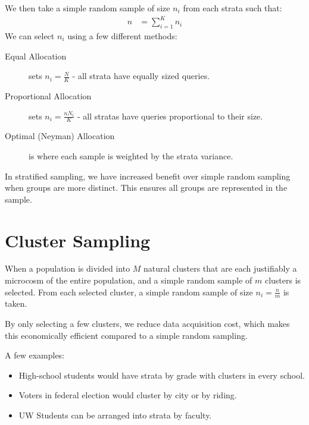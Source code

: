                 We then take a simple random sample of size $n_i$ from each strata such that:
                \begin{align*}
                    n &= \sum_{i=1}^K n_i
                \end{align*}
                We can select $n_i$ using a few different methods:
                \begin{description}
                    \item[Equal Allocation] sets $n_i = \frac{N}{K}$ - all strata have equally sized queries.
                    \item[Proportional Allocation] sets $n_i = \frac{n N_i}{K}$ - all stratas have queries proportional to their size.
                    \item[Optimal (Neyman) Allocation] is where each sample is weighted by the strata variance.
                \end{description}
                In stratified sampling, we have increased benefit over simple random sampling when groups are more distinct.
                This ensures all groups are represented in the sample.
            \section{Cluster Sampling} %
            \label{sec:cluster_sampling}
                When a population is divided into $M$ natural clusters that are each justifiably a microcosm of the entire population, and a simple random sample of $m$ clusters is selected.
                From each selected cluster, a simple random sample of size $n_i = \frac{n}{m}$ is taken.

                By only selecting a few clusters, we reduce data acquisition cost, which makes this economically efficient compared to a simple random sampling.

                A few examples:
                \begin{itemize}
                    \item High-school students would have strata by grade with clusters in every school.
                    \item Voters in federal election would cluster by city or by riding.
                    \item UW Students can be arranged into strata by faculty.
                \end{itemize}
